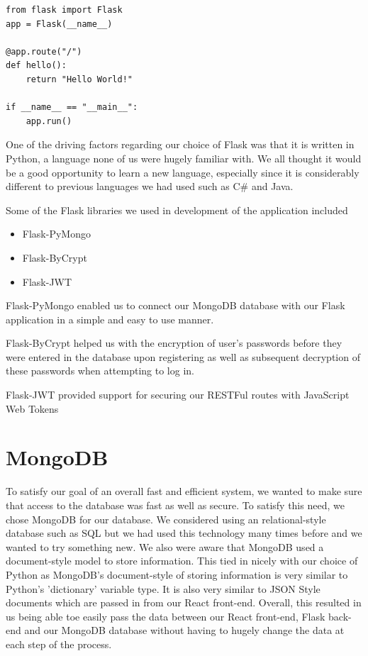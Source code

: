 \begin{verbatim}
from flask import Flask
app = Flask(__name__)

@app.route("/")
def hello():
    return "Hello World!"

if __name__ == "__main__":
    app.run()
\end{verbatim}

One of the driving factors regarding our choice of Flask was that it is written in Python, a language none of us were hugely familiar with. We all thought it would be a good opportunity to learn a new language, especially since it is considerably
different to previous languages we had used such as C\# and Java.

Some of the Flask libraries we used in development of the application included 

\begin{itemize}
  \item Flask-PyMongo
  \item Flask-ByCrypt
  \item Flask-JWT
\end{itemize}

Flask-PyMongo enabled us to connect our MongoDB database with our Flask application in a simple and easy to use manner. 

Flask-ByCrypt helped us with the encryption of user's passwords before they were entered in the database upon registering as well as subsequent decryption of these passwords when attempting to log in.

Flask-JWT provided support for securing our RESTFul routes with JavaScript Web Tokens 

\section{MongoDB}
To satisfy our goal of an overall fast and efficient system, we wanted to make sure that access to the database was fast as well as secure. To satisfy this need, we chose MongoDB for our database.
We considered using an relational-style database such as SQL but we had used this technology many times before and we wanted to try something new. We also were aware that MongoDB used a document-style model to store information. This tied in nicely with our choice of Python as MongoDB's document-style of storing information is very similar to Python's 'dictionary' variable type.
It is also very similar to JSON Style documents which are passed in from our React front-end. Overall, this resulted in us being able toe easily pass the data between our React front-end, Flask back-end and our MongoDB database without having to hugely change the data at each step of the process.

